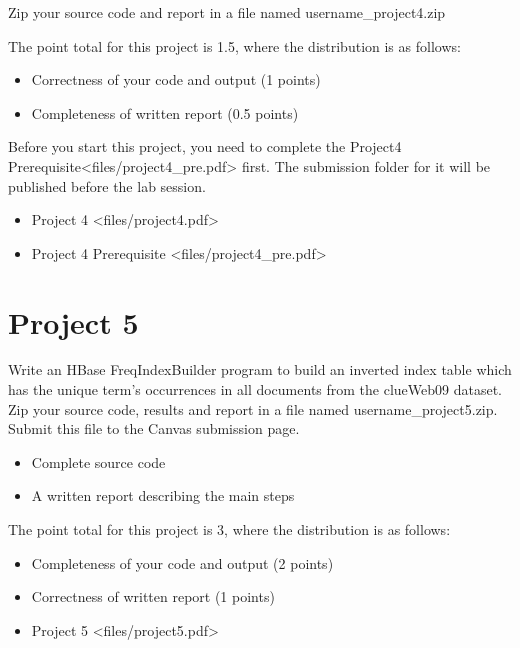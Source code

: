 Zip your source code and report in a file named username\_project4.zip

The point total for this project is 1.5, where the distribution is as
follows:

\begin{itemize}
\tightlist
\item
  Correctness of your code and output (1 points)
\item
  Completeness of written report (0.5 points)
\end{itemize}

Before you start this project, you need to complete the
Project4 Prerequisite\textless{}files/project4\_pre.pdf\textgreater{}
first. The submission folder for it will be published before the lab
session.

\begin{itemize}
\tightlist
\item
  Project 4 \textless{}files/project4.pdf\textgreater{}
\item
  Project 4 Prerequisite \textless{}files/project4\_pre.pdf\textgreater{}
\end{itemize}

\chapter{Project 5}\label{project-5}

Write an HBase FreqIndexBuilder program to build an inverted index table
which has the unique term's occurrences in all documents from the
clueWeb09 dataset. Zip your source code, results and report in a file
named username\_project5.zip. Submit this file to the Canvas submission
page.

\begin{itemize}
\tightlist
\item
  Complete source code
\item
  A written report describing the main steps
\end{itemize}

The point total for this project is 3, where the distribution is as
follows:

\begin{itemize}
\tightlist
\item
  Completeness of your code and output (2 points)
\item
  Correctness of written report (1 points)
\item
  Project 5 \textless{}files/project5.pdf\textgreater{}
\end{itemize}

